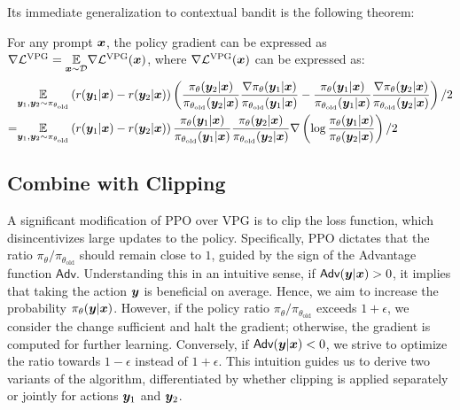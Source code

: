 \documentclass{article} %
\begin{document}
\normalsize
Its immediate generalization to contextual bandit is the following theorem:
\begin{theorem} For any prompt ${\bm{x}}$, the policy gradient can be expressed as $\nabla \mathcal{L}^{\text{VPG}} = \underset{{\bm{x}}\sim \mathcal{D}}{\mathbb{E}} \nabla \mathcal{L}^{\text{VPG}}({\bm{x}})$, where $\nabla\mathcal{L}^{\text{VPG}}({\bm{x}})$ can be expressed as:
{\begin{align*}
&\underset{
{\bm{y}}_1,{\bm{y}}_2\sim\pi_{\theta_{\text{old}}}
}{\mathbb{E}}\left(r({\bm{y}}_1|{\bm{x}})-r({\bm{y}}_2|{\bm{x}})\right)\left(\frac{\pi_\theta({\bm{y}}_2|{\bm{x}})}{\pi_{\theta_{\text{old}}}({\bm{y}}_2|{\bm{x}})}\frac{\nabla\pi_\theta({\bm{y}}_1|{\bm{x}})}{\pi_{\theta_{\text{old}}}({\bm{y}}_1|{\bm{x}})}-\frac{\pi_\theta({\bm{y}}_1|{\bm{x}})}{\pi_{\theta_{\text{old}}}({\bm{y}}_1|{\bm{x}})}\frac{\nabla\pi_\theta({\bm{y}}_2|{\bm{x}})}{\pi_{\theta_{\text{old}}}({\bm{y}}_2|{\bm{x}})}\right)/2\\
=&\underset{{\bm{y}}_1,{\bm{y}}_2\sim\pi_{\theta_{\text{old}}}}{\mathbb{E}}\left(r({\bm{y}}_1|{\bm{x}})-r({\bm{y}}_2|{\bm{x}})\right)\frac{\pi_\theta({\bm{y}}_1|{\bm{x}})}{\pi_{\theta_{\text{old}}}({\bm{y}}_1|{\bm{x}})}\frac{\pi_\theta({\bm{y}}_2|{\bm{x}})}{\pi_{\theta_{\text{old}}}({\bm{y}}_2|{\bm{x}})}\nabla\left(\log\frac{\pi_\theta({\bm{y}}_1|{\bm{x}})}{\pi_\theta({\bm{y}}_2|{\bm{x}})}\right)/2
\end{align*}}\label{theorem:ppg}
\end{theorem}
\normalsize
\subsection{Combine with Clipping}
\label{sec:clipping}
A significant modification of PPO over VPG is to clip the loss function, which disincentivizes large updates to the policy. Specifically, PPO dictates that the ratio $\pi_\theta/\pi_{\theta_{\text{old}}}$ should remain close to $1$, guided by the sign of the Advantage function $\textsf{Adv}$. 
Understanding this in an intuitive sense, if $\textsf{Adv}({\bm{y}}|{\bm{x}}) > 0$, it implies that taking the action ${\bm{y}}$ is beneficial on average. Hence, we aim to increase the probability $\pi_\theta({\bm{y}}|{\bm{x}})$. However, if the policy ratio $\pi_\theta/\pi_{\theta_{\text{old}}}$ exceeds $1+\epsilon$, we consider the change sufficient and halt the gradient; otherwise, the gradient is computed for further learning. Conversely, if $\textsf{Adv}({\bm{y}}|{\bm{x}})<0$, we strive to optimize the ratio towards $1-\epsilon$ instead of $1+\epsilon$. This intuition guides us to derive two variants of the algorithm, differentiated by whether clipping is applied separately or jointly for actions ${\bm{y}}_1$ and ${\bm{y}}_2$.
\end{document}
